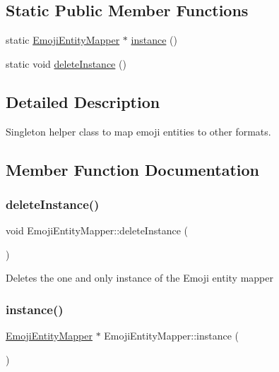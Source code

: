 \subsection*{Static Public Member Functions}
\begin{DoxyCompactItemize}
\item 
static \mbox{\hyperlink{class_emoji_entity_mapper}{Emoji\+Entity\+Mapper}} $\ast$ \mbox{\hyperlink{class_emoji_entity_mapper_afbf245f030b4c8bd5b6e4b5fa460804f}{instance}} ()
\item 
static void \mbox{\hyperlink{class_emoji_entity_mapper_ab9aab069bfc06478322bf60994778a64}{delete\+Instance}} ()
\end{DoxyCompactItemize}


\subsection{Detailed Description}
Singleton helper class to map emoji entities to other formats. 

\subsection{Member Function Documentation}
\mbox{\label{class_emoji_entity_mapper_ab9aab069bfc06478322bf60994778a64}} 
\subsubsection{\texorpdfstring{deleteInstance()}{deleteInstance()}}
{\footnotesize\ttfamily void Emoji\+Entity\+Mapper\+::delete\+Instance (\begin{DoxyParamCaption}{ }\end{DoxyParamCaption})\hspace{0.3cm}{\ttfamily [static]}}

Deletes the one and only instance of the Emoji entity mapper \mbox{\label{class_emoji_entity_mapper_afbf245f030b4c8bd5b6e4b5fa460804f}} 
\subsubsection{\texorpdfstring{instance()}{instance()}}
{\footnotesize\ttfamily \mbox{\hyperlink{class_emoji_entity_mapper}{Emoji\+Entity\+Mapper}} $\ast$ Emoji\+Entity\+Mapper\+::instance (\begin{DoxyParamCaption}{ }\end{DoxyParamCaption})\hspace{0.3cm}{\ttfamily [static]}}

